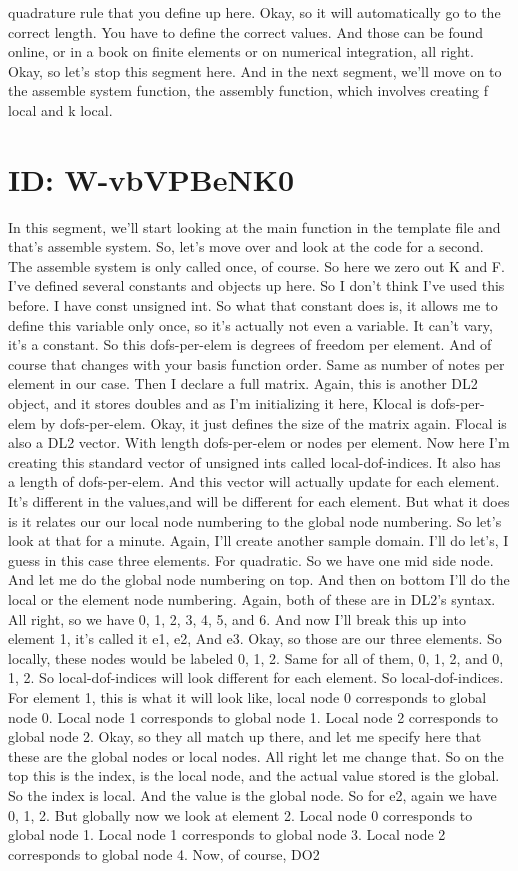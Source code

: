 \documentclass[10pt]{article}
\begin{document}
{quadrature rule that you define up here. Okay, so it will automatically go to the correct length. You have to define the correct values. And those can be found online, or in a book on finite elements or on numerical integration, all right. Okay, so let's stop this segment here. And in the next segment, we'll move on to the assemble system function, the assembly function, which involves creating f local and k local.

\section*{ID: W-vbVPBeNK0}
In this segment, we'll start looking at the main function in the template file and that's assemble system. So, let's move over and look at the code for a second. The assemble system is only called once, of course. So here we zero out K and F. I've defined several constants and objects up here. So I don't think I've used this before. I have const unsigned int. So what that constant does is, it allows me to define this variable only once, so it's actually not even a variable. It can't vary, it's a constant. So this dofs-per-elem is degrees of freedom per element. And of course that changes with your basis function order. Same as number of notes per element in our case. Then I declare a full matrix. Again, this is another DL2 object, and it stores doubles and as I'm initializing it here, Klocal is dofs-per-elem by dofs-per-elem. Okay, it just defines the size of the matrix again. Flocal is also a DL2 vector. With length dofs-per-elem or nodes per element. Now here I'm creating this standard vector of unsigned ints called local-dof-indices. It also has a length of dofs-per-elem. And this vector will actually update for each element. It's different in the values,and will be different for each element. But what it does is it relates our our local node numbering to the global node numbering. So let's look at that for a minute. Again, I'll create another sample domain. I'll do let's, I guess in this case three elements. For quadratic. So we have one mid side node. And let me do the global node numbering on top. And then on bottom I'll do the local or the element node numbering. Again, both of these are in DL2's syntax. All right, so we have 0, 1, 2, 3, 4, 5, and 6. And now I'll break this up into element 1, it's called it e1, e2, And e3. Okay, so those are our three elements. So locally, these nodes would be labeled 0, 1, 2. Same for all of them, 0, 1, 2, and 0, 1, 2. So local-dof-indices will look different for each element. So local-dof-indices. For element 1, this is what it will look like, local node 0 corresponds to global node 0. Local node 1 corresponds to global node 1. Local node 2 corresponds to global node 2. Okay, so they all match up there, and let me specify here that these are the global nodes or local nodes. All right let me change that. So on the top this is the index, is the local node, and the actual value stored is the global. So the index is local. And the value is the global node. So for e2, again we have 0, 1, 2. But globally now we look at element 2. Local node 0 corresponds to global node 1. Local node 1 corresponds to global node 3. Local node 2 corresponds to global node 4. Now, of course, DO2 }
\end{document}
